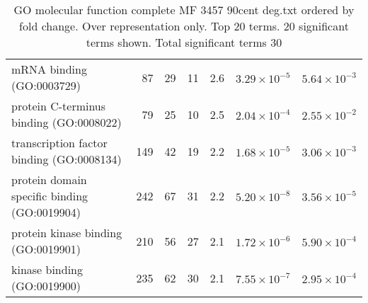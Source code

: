 \begin{table}[ht]
\begin{adjustbox}{width=\textwidth}
\begin{tabular}{lrrrrrr}
  mRNA binding (GO:0003729) & 87 & 29 & 11 & 2.6 & $3.29 \times 10^{-5}$ & $5.64 \times 10^{-3}$ \\ 
  protein C-terminus binding (GO:0008022) & 79 & 25 & 10 & 2.5 & $2.04 \times 10^{-4}$ & $2.55 \times 10^{-2}$ \\ 
  transcription factor binding (GO:0008134) & 149 & 42 & 19 & 2.2 & $1.68 \times 10^{-5}$ & $3.06 \times 10^{-3}$ \\ 
  protein domain specific binding (GO:0019904) & 242 & 67 & 31 & 2.2 & $5.20 \times 10^{-8}$ & $3.56 \times 10^{-5}$ \\ 
  protein kinase binding (GO:0019901) & 210 & 56 & 27 & 2.1 & $1.72 \times 10^{-6}$ & $5.90 \times 10^{-4}$ \\ 
  kinase binding (GO:0019900) & 235 & 62 & 30 & 2.1 & $7.55 \times 10^{-7}$ & $2.95 \times 10^{-4}$ \\ 
   \hline
\end{tabular}
\end{adjustbox}
\caption{GO molecular function complete MF 3457 90cent deg.txt ordered by fold change. Over representation only. Top 20 terms. 20 significant terms shown. Total significant terms 30} 
\label{tab:GO molecular function complete MF 3457 90cent deg.txt ordered by fold change. Over representation only. Top 20 terms. 20 significant terms shown. Total significant terms 30}
\end{table}


\clearpage

